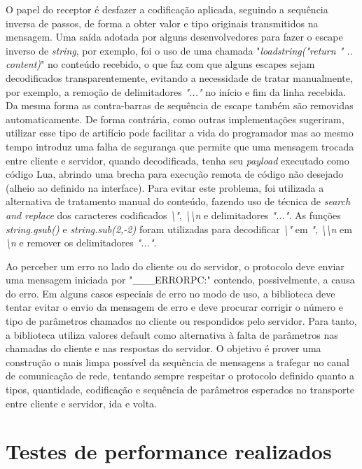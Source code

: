 \documentclass[11pt]{article}
\begin{document}
O papel do receptor é desfazer a codificação aplicada, seguindo a sequência
inversa de passos, de forma a obter valor e tipo originais transmitidos na
mensagem. Uma saída adotada por alguns desenvolvedores para fazer o escape
inverso de \textit{string}, por exemplo, foi o uso de uma chamada
"\textit{loadstring("return " .. content)}" no conteúdo recebido, o que faz com
que alguns escapes sejam decodificados transparentemente, evitando a necessidade
de tratar manualmente, por exemplo, a remoção de delimitadores \textit{"..."} no
início e fim da linha recebida. Da mesma forma as contra-barras de sequência de
escape também são removidas automaticamente. De forma contrária, como outras
implementações sugeriram, utilizar esse tipo de artifício pode facilitar a vida
do programador mas ao mesmo tempo introduz uma falha de segurança que permite
que uma mensagem trocada entre cliente e servidor, quando decodificada, tenha
seu \textit{payload} executado como código Lua, abrindo uma brecha para execução
remota de código não desejado (alheio ao definido na interface). Para evitar
este problema, foi utilizada a alternativa de tratamento manual do conteúdo,
fazendo uso de técnica de \textit{search and replace} dos caracteres codificados
\textit{\textbackslash{}"}, \textit{\textbackslash{}\textbackslash{}n} e
delimitadores \textit{"..."}. As funções \textit{string.gsub()} e
\textit{string.sub(2,-2)} foram utilizadas para decodificar
\textit{\textbackslash{}"} em \textit{"},
\textit{\textbackslash{}\textbackslash{}n} em \textit{\textbackslash{}n} e
remover os delimitadores \textit{"..."}.

Ao perceber um erro no lado do cliente ou do servidor, o protocolo deve enviar
uma mensagem iniciada por "\_\_\_ERRORPC:" contendo, possivelmente, a causa do
erro. Em alguns casos especiais de erro no modo de uso, a biblioteca deve tentar
evitar o envio da mensagem de erro e deve procurar corrigir o número e tipo de
parâmetros chamados no cliente ou respondidos pelo servidor. Para tanto, a
biblioteca utiliza valores default como alternativa à falta de parâmetros nas
chamadas do cliente e nas respostas do servidor. O objetivo é prover uma
construção o mais limpa possível da sequência de mensagens a trafegar no canal
de comunicação de rede, tentando sempre respeitar o protocolo definido quanto a
tipos, quantidade, codificação e sequência de parâmetros esperados no transporte
entre cliente e servidor, ida e volta.

\section{Testes de performance realizados}\label{sec:perf}
\end{document}
